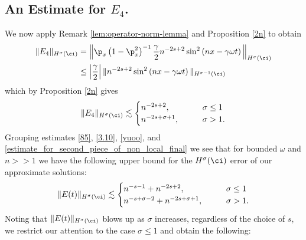 	\subsection{An Estimate for $\hyperref[90]{E_4}$.}
	We now apply Remark \ref{lem:operator-norm-lemma} and Proposition 
	\ref{2n} to obtain
	\begin{equation*}
		\begin{split}
			\|E_4\|_{H^\sigma(\ci)}
			& = \Big \|\p_x \left( 1 - \p_x^2 \right)^{-1} 
			\frac{\gamma}{2}n^{-2s+2}\sin^2\left(
			nx - \gamma \omega t \right) \Big \|_{H^\sigma(\ci)}
			\\
			& \leq \left | \frac{\gamma}{2} \right |  \| 
			n^{-2s+2}\sin^2\left( nx - \gamma \omega t
			\right)\|_{H^{\sigma -1}(\ci)}
			\end{split}
	\end{equation*}
	which by Proposition \ref{2n} gives
	\begin{equation}
			\label{estimate_for_second_piece_of_non_local_final}
		\begin{split}
			\|E_4\|_{H^\sigma(\ci)} \lesssim 
			\begin{cases}
				n^{-2s+2}, \qquad & \sigma \le 1
				\\
				n^{-2s+ \sigma + 1}, \qquad & \sigma >1.
			\end{cases}
		\end{split}
	\end{equation}
	Grouping estimates \eqref{85}, \eqref{3.10}, \eqref{yuoo}, and
	\eqref{estimate_for_second_piece_of_non_local_final} we see that for bounded $\omega$ and $n >> 1$
	we have the following upper bound for the $H^\sigma(\ci)$ error
	of our approximate solutions:
	\begin{equation*}
		\begin{split}
			\|E(t)\|_{H^{\sigma}(\ci)} \lesssim 
			  \begin{cases}
				  n^{-s-1} + n^{-2s +2}, \qquad & \sigma \le 1
				  \\
				  n^{-s + \sigma - 2} + n^{-2s + \sigma + 1}, \qquad &
				  \sigma > 1.
			  \end{cases}
		\end{split}
	\end{equation*}
		Noting that $\|E(t)\|_{H^\sigma(\ci)}$ blows up as $\sigma$ 
		increases,
	regardless of the choice of $s$, we restrict our attention to the case $\sigma \le 1$
	and obtain the following:
